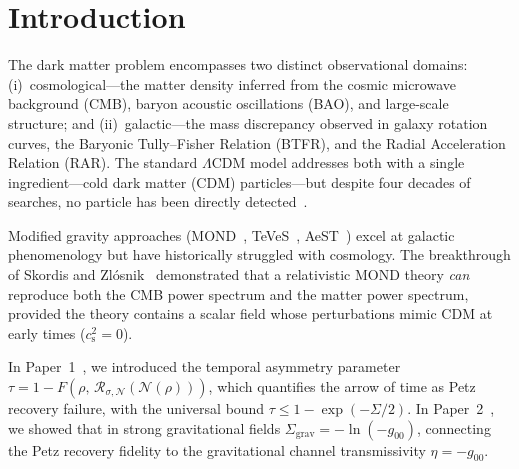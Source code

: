 \documentclass[prd,twocolumn,superscriptaddress,longbibliography,floatfix]{revtex4-2}
\newcommand{\tauasym}{\tau}
\newcommand{\cs}{c_{\mathrm{s}}}
\begin{document}
\section{Introduction}
\label{sec:intro}

The dark matter problem encompasses two distinct observational
domains: (i)~cosmological---the matter density inferred from
the cosmic microwave background (CMB), baryon acoustic oscillations
(BAO), and large-scale structure; and (ii)~galactic---the mass
discrepancy observed in galaxy rotation curves, the Baryonic
Tully--Fisher Relation (BTFR), and the Radial Acceleration
Relation (RAR).  The standard $\Lambda$CDM model addresses both
with a single ingredient---cold dark matter (CDM) particles---but
despite four decades of searches, no particle has been directly
detected~\cite{Schumann2019,XENON2023,LZ2024}.

Modified gravity approaches (MOND~\cite{Milgrom1983},
TeVeS~\cite{Bekenstein2004}, AeST~\cite{SZ2021prl,SZ2021extended})
excel at galactic phenomenology but have historically struggled
with cosmology.  The breakthrough of Skordis and
Zl\'{o}snik~\cite{SZ2021prl} demonstrated that a relativistic
MOND theory \emph{can} reproduce both the CMB power spectrum and
the matter power spectrum, provided the theory contains a scalar
field whose perturbations mimic CDM at early times ($\cs^2 = 0$).

In Paper~1~\cite{Paper1}, we introduced the temporal asymmetry
parameter $\tauasym = 1 - F(\rho,\,\mathcal{R}_{\sigma,\mathcal{N}}
(\mathcal{N}(\rho)))$, which quantifies the arrow of time as Petz
recovery failure, with the universal bound
$\tauasym \leq 1 - \exp(-\Sigma/2)$.  In Paper~2~\cite{Paper2},
we showed that in strong gravitational fields
$\Sigma_{\mathrm{grav}} = -\ln(-g_{00})$, connecting the Petz
recovery fidelity to the gravitational channel transmissivity
$\eta = -g_{00}$.
\end{document}
